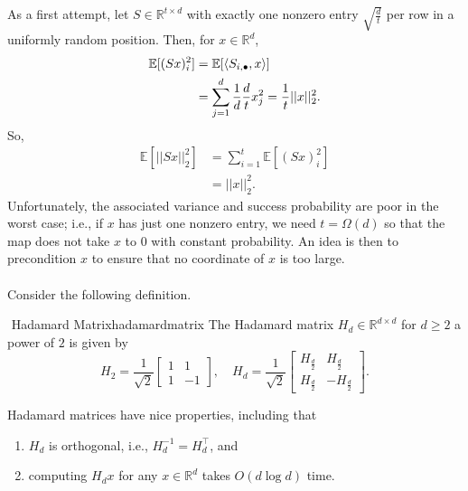         \vphantom
        \\
        \\
        As a first attempt, let \(S\in\mathbb{R}^{t\times d}\) with exactly one nonzero entry \(\sqrt{\frac{d}{t}}\) per row in a uniformly random position. Then, for \(x\in\mathbb{R}^d\), 
        \begin{align*}
            \mathbb{E}[(Sx)_i^2]&=\mathbb{E}[\left\langle S_{i,\bullet},x\right\rangle] \\
            &=\sum_{j=1}^d \frac{1}{d}\frac{d}{t}x_j^2=\frac{1}{t}||x||_2^2.
        \end{align*}
        So,
        \begin{align*}
            \mathbb{E}[||Sx||_2^2]&=\sum_{i=1}^t\mathbb{E}[(Sx)_i^2] \\
            &=||x||_2^2.
        \end{align*}
        Unfortunately, the associated variance and success probability are poor in the worst case; i.e., if \(x\) has just one nonzero entry, we need \(t=\Omega(d)\) so that the map does not take \(x\) to \(0\) with constant probability. An idea is then to precondition \(x\) to ensure that no coordinate of \(x\) is too large.
        \pagebreak
        \vphantom
        \\
        \\
        Consider the following definition.
        \begin{definition}{\Stop\,\,Hadamard Matrix}{hadamardmatrix}
            The Hadamard matrix \(H_d\in\mathbb{R}^{d\times d}\) for \(d\geq2\) a power of \(2\) is given by
            \begin{equation*}
                H_2=\frac{1}{\sqrt{2}}\begin{bmatrix}
                    1 & 1 \\
                    1 & -1
                \end{bmatrix},\quad H_d=\frac{1}{\sqrt{2}}\begin{bmatrix}
                    H_{\frac{d}{2}} & H_{\frac{d}{2}} \\
                    H_{\frac{d}{2}} & -H_{\frac{d}{2}}
                \end{bmatrix}.
            \end{equation*}
        \end{definition}
        \begin{remark*}
            Hadamard matrices have nice properties, including that
            \begin{enumerate}
                \item \(H_d\) is orthogonal, i.e., \(H_d^{-1}=H_d^\top\), and
                \item computing \(H_dx\) for any \(x\in\mathbb{R}^d\) takes \(O(d\log d)\) time.
            \end{enumerate}
        \end{remark*}
